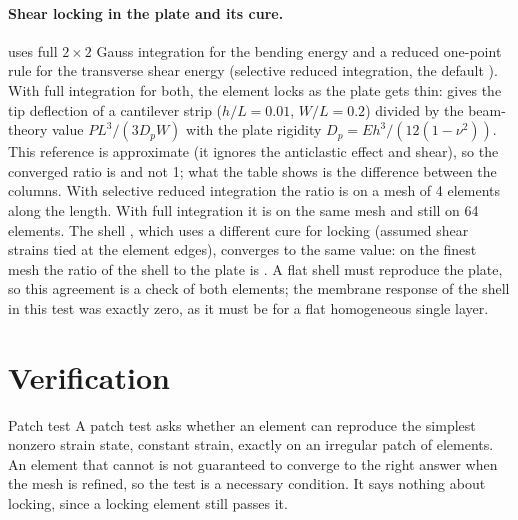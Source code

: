 \paragraph{Shear locking in the plate and its cure.}
 uses full $2\times2$ Gauss integration for the bending energy and a reduced one-point rule for the transverse shear energy (selective reduced integration, the default ). With full integration for both, the element locks as the plate gets thin:  gives the tip deflection of a cantilever strip ($h/L=0.01$, $W/L=0.2$) divided by the beam-theory value $PL^3/(3D_pW)$ with the plate rigidity $D_p=Eh^3/(12(1-\nu^2))$. This reference is approximate (it ignores the anticlastic effect and shear), so the converged ratio is \cecPlateSriFine{} and not 1; what the table shows is the difference between the columns. With selective reduced integration the ratio is \cecPlateSriCoarse{} on a mesh of 4 elements along the length. With full integration it is \cecPlateFullCoarse{} on the same mesh and still \cecPlateFullFine{} on 64 elements. The shell , which uses a different cure for locking (assumed shear strains tied at the element edges), converges to the same value: on the finest mesh the ratio of the shell to the plate is \cecPlateRatioFS. A flat shell must reproduce the plate, so this agreement is a check of both elements; the membrane response of the shell in this test was exactly zero, as it must be for a flat homogeneous single layer.

\begin{table}[ht]
\centering\small

\caption{Tip deflection of a flat cantilever strip divided by the beam-theory value with plate rigidity (an approximate reference), against the number of elements along the length (a quarter as many across).}\label{tab:el-plate}
\end{table}

\section{Verification}\label{sec:el-verif}

\begin{sidenote}{Patch test}
A patch test asks whether an element can reproduce the simplest nonzero strain state, constant strain, exactly on an irregular patch of elements. An element that cannot is not guaranteed to converge to the right answer when the mesh is refined, so the test is a necessary condition. It says nothing about locking, since a locking element still passes it.
\end{sidenote}

